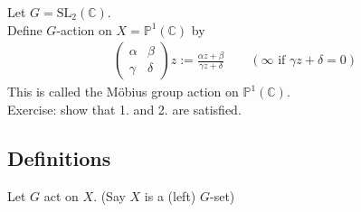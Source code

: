 \documentclass[11pt]{article}
\newcommand{\0}{\emptyset}
\newcommand{\C}{\mathbb{C}}
\begin{document}

Let \(G=\text{SL}_{2}(\C)\).\\[0pt]
Define \(G\)-action on \(X=\mathbb{P}^{1}(\C)\) by\\[0pt]
\begin{align*}
  \begin{pmatrix}
    \alpha & \beta \\
    \gamma & \delta
  \end{pmatrix}
  z := \frac{\alpha z+\beta}{\gamma z+\delta}
  \qquad (\infty\text{ if } \gamma z+\delta = 0)
\end{align*}
This is called the Möbius group action on \(\mathbb{P}^{1}(\C)\).\\[0pt]
Exercise: show that 1. and 2. are satisfied.\\[0pt]
\subsection*{Definitions}
\label{sec:org2b59a06}
Let \(G\) act on \(X\). (Say \(X\) is a (left) \(G\)-set)\\[0pt]
\end{document}
